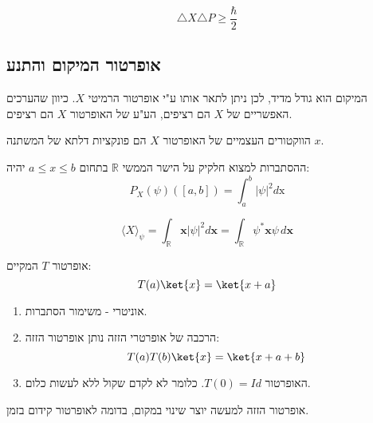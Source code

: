 \documentclass{tstextbook}
\begin{document}
\begin{proposition}
$$\triangle X\triangle P\geq{\frac{\hbar}{2}}$$

\end{proposition}
\subsection{אופרטור המיקום והתנע}

\begin{definition}
המיקום הוא גודל מדיד, לכן ניתן לתאר אותו ע"י אופרטור הרמיטי \(X\). כיוון שהערכים האפשריים של \(X\) הם רציפים, הע"ע של האופרטור \(X\) הם רציפים.

\end{definition}
\begin{proposition}
הווקטורים העצמיים של האופרטור \(X\) הם פונקציות דלתא של המשתנה \(x\).

\end{proposition}
\begin{proposition}
ההסתברות למצוא חלקיק על הישר הממשי \(\mathbb{R}\) בתחום \(a\leq x \leq b\) יהיה:
$$P_{X}(\psi)([a,b])=\int_{a}^{b}|\psi|^{2}d\!\mathrm{x}$$

\end{proposition}
\begin{proposition}
$$\langle X\rangle_{\psi}=\int_{\mathbb{R}}\mathbf{x}|\psi|^{2}d\mathbf{x}=\int_{\mathbb{R}}{\psi^{*}\mathbf{x}\psi\,d\mathbf{x}}$$

\end{proposition}
\begin{definition}
אופרטור \(T\) המקיים:
$$T(a)\ket{x} = \ket{x+a}$$

\end{definition}
\begin{proposition}
  \begin{enumerate}
    \item אוניטרי - משימור הסתברות.  


    \item הרכבה של אופרטרי הזזה נותן אופרטור הזזה: 
$$T(a)T(b)\ket{x}=\ket{x+a+b}  $$


    \item האופרטור \(T(0)=Id\). כלומר לא לקדם שקול ללא לעשות כלום. 


  \end{enumerate}
\end{proposition}
\begin{remark}
אופרטור הזזה למעשה יוצר שינוי במקום, בדומה לאופרטור קידום בזמן.

\end{remark}
\end{document}

